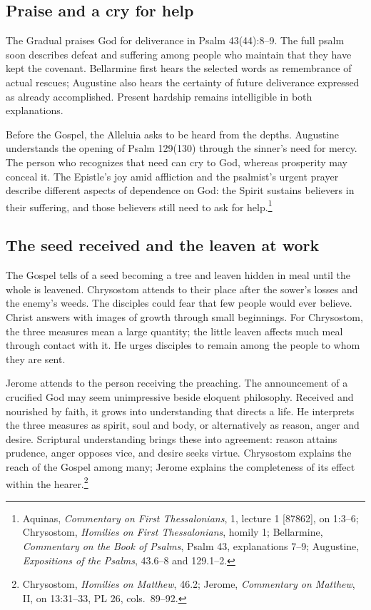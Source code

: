 \subsection{Praise and a cry for help}

The Gradual praises God for deliverance in Psalm 43(44):8--9. The full psalm soon describes defeat and suffering among people who maintain that they have kept the covenant. Bellarmine first hears the selected words as remembrance of actual rescues; Augustine also hears the certainty of future deliverance expressed as already accomplished. Present hardship remains intelligible in both explanations.

Before the Gospel, the Alleluia asks to be heard from the depths. Augustine understands the opening of Psalm 129(130) through the sinner's need for mercy. The person who recognizes that need can cry to God, whereas prosperity may conceal it. The Epistle's joy amid affliction and the psalmist's urgent prayer describe different aspects of dependence on God: the Spirit sustains believers in their suffering, and those believers still need to ask for help.\footnote{Aquinas, \textit{Commentary on First Thessalonians}, 1, lecture 1 [87862], on 1:3--6; Chrysostom, \textit{Homilies on First Thessalonians}, homily 1; Bellarmine, \textit{Commentary on the Book of Psalms}, Psalm 43, explanations 7--9; Augustine, \textit{Expositions of the Psalms}, 43.6--8 and 129.1--2.}

\clearpage
\subsection{The seed received and the leaven at work}

The Gospel tells of a seed becoming a tree and leaven hidden in meal until the whole is leavened. Chrysostom attends to their place after the sower's losses and the enemy's weeds. The disciples could fear that few people would ever believe. Christ answers with images of growth through small beginnings. For Chrysostom, the three measures mean a large quantity; the little leaven affects much meal through contact with it. He urges disciples to remain among the people to whom they are sent.

Jerome attends to the person receiving the preaching. The announcement of a crucified God may seem unimpressive beside eloquent philosophy. Received and nourished by faith, it grows into understanding that directs a life. He interprets the three measures as spirit, soul and body, or alternatively as reason, anger and desire. Scriptural understanding brings these into agreement: reason attains prudence, anger opposes vice, and desire seeks virtue. Chrysostom explains the reach of the Gospel among many; Jerome explains the completeness of its effect within the hearer.\footnote{Chrysostom, \textit{Homilies on Matthew}, 46.2; Jerome, \textit{Commentary on Matthew}, II, on 13:31--33, PL 26, cols.~89--92.}

